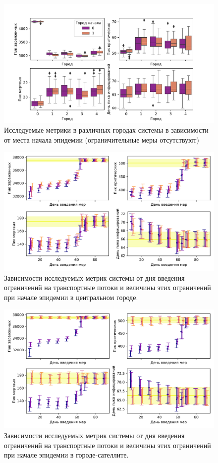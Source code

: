 \documentclass[a4paper,12pt]{article} %
\begin{document}
\begin{figure}[H]
    \centering
    \includegraphics[width=\linewidth]{images/boxs.pdf}
    \caption{Исследуемые метрики в различных городах системы в зависимости от места начала эпидемии (ограничительные меры отсутствуют)}
\end{figure}

\begin{figure}[H]
    \centering
    \includegraphics[width=\linewidth]{images/hists.pdf}
    \caption{Зависимости исследуемых метрик системы от дня введения ограничений на транспортные потоки и величины этих ограничений при начале эпидемии в центральном городе.}
\end{figure}

\begin{figure}[H]
    \centering
    \includegraphics[width=\linewidth]{images/hists1.pdf}
    \caption{Зависимости исследуемых метрик системы от дня введения ограничений на транспортные потоки и величины этих ограничений при начале эпидемии в городе-сателлите.}
\end{figure}
\end{document}
